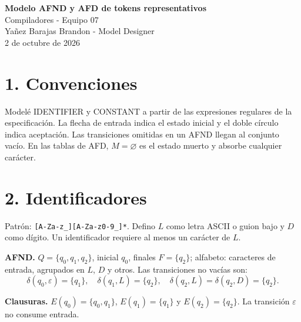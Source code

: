 \documentclass[10pt,letterpaper]{article}
\newcommand{\datos}[1]{\begin{center}{\Large\bfseries\color{navy}#1}\\[8pt]
Compiladores - Equipo 07\\Yañez Barajas Brandon - Model Designer\\2 de octubre de 2026\end{center}}
\begin{document}
\datos{Modelo AFND y AFD de tokens representativos}
\section*{1. Convenciones}
Modelé IDENTIFIER y CONSTANT a partir de las expresiones regulares de la especificación. La flecha de entrada indica el estado inicial y el doble círculo indica aceptación. Las transiciones omitidas en un AFND llegan al conjunto vacío. En las tablas de AFD, $M=\varnothing$ es el estado muerto y absorbe cualquier carácter.

\section*{2. Identificadores}
Patrón: \verb|[A-Za-z_][A-Za-z0-9_]*|. Defino $L$ como letra ASCII o guion bajo y $D$ como dígito. Un identificador requiere al menos un carácter de $L$.

\textbf{AFND.} $Q=\{q_0,q_1,q_2\}$, inicial $q_0$, finales $F=\{q_2\}$; alfabeto: caracteres de entrada, agrupados en $L$, $D$ y otros. Las transiciones no vacías son:
\[\delta(q_0,\varepsilon)=\{q_1\},\quad \delta(q_1,L)=\{q_2\},\quad
\delta(q_2,L)=\delta(q_2,D)=\{q_2\}.\]
\begin{center}\end{center}
\textbf{Clausuras.} $E(q_0)=\{q_0,q_1\}$, $E(q_1)=\{q_1\}$ y $E(q_2)=\{q_2\}$. La transición $\varepsilon$ no consume entrada.
\end{document}
